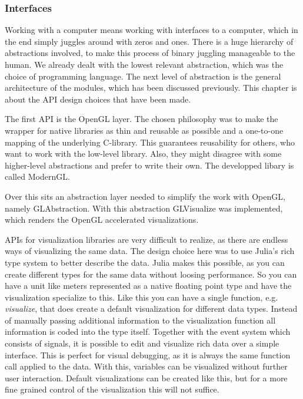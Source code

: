 \subsubsection{Interfaces}

Working with a computer means working with interfaces to a computer, which in the end simply juggles around with zeros and ones. There is a huge hierarchy of abstractions involved, to make this process of binary juggling manageable to the human.
We already dealt with the lowest relevant abstraction, which was the choice of programming language.
The next level of abstraction is the general architecture of the modules, which has been discussed previously. 
This chapter is about the API design choices that have been made.

The first \ac{API} is the \ac{OpenGL} layer. 
The chosen philosophy was to make the wrapper for native libraries as thin and reusable as possible and a one-to-one mapping of the underlying C-library.
This guarantees reusability for others, who want to work with the low-level library. Also, they might disagree with some higher-level abstractions and prefer to write their own.
The developped libary is called ModernGL\cite{ModernGL}.

Over this sits an abstraction layer needed to simplify the work with \ac{OpenGL}, namely GLAbstraction\cite{GLAbstraction}.
With this abstraction GLVisualize\cite{GLVisualize} was implemented, which renders the \ac{OpenGL} accelerated visualizations.

\ac{API}s for visualization libraries are very difficult to realize, as there are endless ways of visualizing the same data.
The design choice here was to use Julia's rich type system to better describe the data. 
Julia makes this possible, as you can create different types for the same data without loosing performance.
So you can have a unit like meters represented as a native floating point type and have the visualization specialize to this.
Like this you can have a single function, e.g. \textit{visualize}, that does create a default visualization for different data types. 
Instead of manually passing additional information to the visualization function all information is coded into the type itself.
Together with the event system which consists of signals, it is possible to edit and visualize rich data over a simple interface. This is perfect for visual debugging, as it is always the same function call applied to the data. 
With this, variables can be visualized without further user interaction.
Default visualizations can be created like this, but for a more fine grained control of the visualization this will not suffice.

